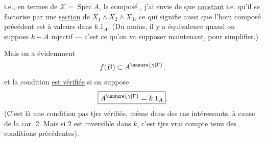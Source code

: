 i.e., en termes de $\mathcal X=\operatorname{Spec}A$, le composé
,
j'ai envie de  que  \uline{constant} i.e. qu'il se factorise par une \uline{section} de $X_1\wedge X_2\wedge X_3$, ce qui signifie aussi que l'hom composé précédent
est à valeurs dans $k.1_A$. (Du moins, il y a équivalence quand on suppose $k\mathbin{-}A$ injectif --- c'est ce qu'on va supposer maintenant, pour simplifier.)

Mais on a évidemment
\[
 f(B)\subset A^{\unsure{\gamma|\Gamma}},
\]
et la condition \uline{est vérifiée} si on suppose
\[
 \boxed{A^{\unsure{\gamma|\Gamma}}=k.1_A}.
\]
(C'est là une condition pas tjrs vérifiée, même dans des cas intéressants, à cause de la car. 2. Mais si $2$ est inversible dans $k$, c'est tjrs vrai compte tenu des conditions précédentes).
